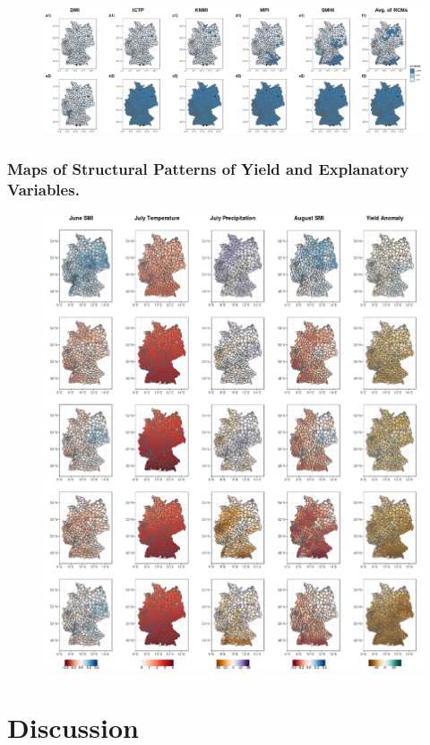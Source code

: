 \documentclass[12pt]{iopart}
\begin{document}
\begin{figure}
	\label{map:2f}
	\centering
	\includegraphics[width=1\textwidth]{figures/Wilcoxon_AllRCMs.png}
	\caption{}
\end{figure}


\subsubsection{Maps of Structural Patterns of Yield and Explanatory Variables.}
\begin{figure}
	\label{map:1f}
	\centering
	\includegraphics[width=1\textwidth]{figures/structural.png}
	\caption{}
\end{figure}







\section{Discussion}
\newcommand{\newblock}{}

%
\end{document}
